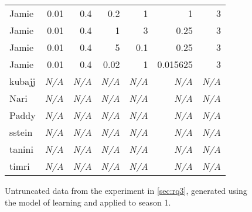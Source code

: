\begin{figure}[h]
\begin{tabular}{l|r|r|r|r|r|r}
Jamie & 0.01 & 0.4 & 0.2 & 1 & 1 & 3 \\
Jamie & 0.01 & 0.4 & 1 & 3 & 0.25 & 3 \\
Jamie & 0.01 & 0.4 & 5 & 0.1 & 0.25 & 3 \\
Jamie & 0.01 & 0.4 & 0.02 & 1 & 0.015625 & 3 \\
kubajj & \emph{N/A} & \emph{N/A} & \emph{N/A} & \emph{N/A} & \emph{N/A} & \emph{N/A} \\
Nari & \emph{N/A} & \emph{N/A} & \emph{N/A} & \emph{N/A} & \emph{N/A} & \emph{N/A} \\
Paddy & \emph{N/A} & \emph{N/A} & \emph{N/A} & \emph{N/A} & \emph{N/A} & \emph{N/A} \\
sstein & \emph{N/A} & \emph{N/A} & \emph{N/A} & \emph{N/A} & \emph{N/A} & \emph{N/A} \\
tanini & \emph{N/A} & \emph{N/A} & \emph{N/A} & \emph{N/A} & \emph{N/A} & \emph{N/A} \\
timri & \emph{N/A} & \emph{N/A} & \emph{N/A} & \emph{N/A} & \emph{N/A} & \emph{N/A} \\
    \end{tabular}
    \caption{Untruncated data from the experiment in \cref{sec:rq3}, generated using the \aspectoriented model of learning and applied to season 1.}
    \label{complete_exp2_result_table}
  
\end{figure}